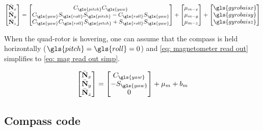 \begin{equation}
		\begin{bmatrix}
		\bar{\bf N}_x \\ \bar{\bf  N}_y \\\bar{\bf  N}_z 
		\end{bmatrix}
		= 
		\begin{bmatrix}
		C_{\gls{pitch}}C_{\gls{yaw}}\\ C_{\gls{yaw}}S_{\gls{roll}}S_{\gls{pitch}} - C_{\gls{roll}}S_{\gls{yaw}}\\C_{\gls{yaw}}C_{\gls{roll}}S_{\gls{pitch}} + S_{\gls{roll}}S_{\gls{yaw}}
		\end{bmatrix}
		+
		\begin{bmatrix}
		\mu_{m-x}\\ \mu_{m-y}\\\mu_{m-z}
		\end{bmatrix}		
		+
		\begin{bmatrix}
		\gls{gyrobaisx}\\ \gls{gyrobaisy}\\\gls{gyrobaisz}
		\end{bmatrix}\label{eq: magnetometer read out}			
\end{equation}



When the quad-rotor is hovering, one can assume that the compass is held horizontally ($\gls{pitch} = \gls{roll} = 0$) and \eqref{eq: magnetometer read out} simplifies to \eqref{eq: mag read out simp}.


\begin{equation}
\begin{bmatrix}
\bar{\bf  N}_x \\ \bar{\bf  N}_y \\\bar{\bf  N}_z 
\end{bmatrix}
= 
\begin{bmatrix}
C_{\gls{yaw}}\\ - S_{\gls{yaw}}\\0
\end{bmatrix}
+
\mu_{m}
+
b_{m}
\label{eq: mag read out simp}
\end{equation}

 \tocless\subsection{Compass code}

